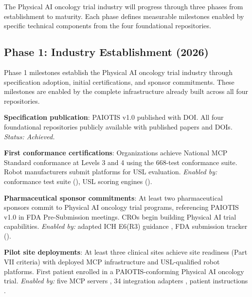 \documentclass[11pt,letterpaper]{article}
\begin{document}
The Physical AI oncology trial industry will progress through three phases from establishment to maturity. Each phase defines measurable milestones enabled by specific technical components from the four foundational repositories.

\subsection{Phase 1: Industry Establishment (2026)}

Phase 1 milestones establish the Physical AI oncology trial industry through specification adoption, initial certifications, and sponsor commitments. These milestones are enabled by the complete infrastructure already built across all four repositories.

\begin{description}[leftmargin=3.5cm, style=sameline]
  \item[Q1 2026] \textbf{Specification publication}: PAIOTIS v1.0 published with DOI. All four foundational repositories publicly available with published papers and DOIs. \textit{Status: Achieved.}

  \item[Q2 2026] \textbf{First conformance certifications}: Organizations achieve National MCP Standard conformance at Levels 3 and 4 using the 668-test conformance suite. Robot manufacturers submit platforms for USL evaluation. \textit{Enabled by:} conformance test suite (), USL scoring engines ().

  \item[Q3 2026] \textbf{Pharmaceutical sponsor commitments}: At least two pharmaceutical sponsors commit to Physical AI oncology trial programs, referencing PAIOTIS v1.0 in FDA Pre-Submission meetings. CROs begin building Physical AI trial capabilities. \textit{Enabled by:} adapted ICH E6(R3) guidance \cite{kawchak2026guidance}, FDA submission tracker ().

  \item[Q4 2026] \textbf{Pilot site deployments}: At least three clinical sites achieve site readiness (Part VII criteria) with deployed MCP infrastructure and USL-qualified robot platforms. First patient enrolled in a PAIOTIS-conforming Physical AI oncology trial. \textit{Enabled by:} five MCP servers \cite{kawchak2026mcp}, 34 integration adapters \cite{kawchak2026nationalmcp}, patient instructions \cite{kawchak2026patient}.
\end{description}
\end{document}
